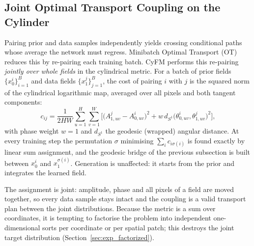 \subsection{Joint Optimal Transport Coupling on the Cylinder}
\label{sec:ot_coupling}
Pairing prior and data samples independently yields crossing conditional paths whose average the network must regress. Minibatch Optimal Transport (OT) \citep{pooladian2023multisample, tong2023improving} reduces this by re-pairing each training batch. CyFM performs this re-pairing \emph{jointly over whole fields} in the cylindrical metric. For a batch of prior fields $\{x_0^i\}_{i=1}^{B}$ and data fields $\{x_1^j\}_{j=1}^{B}$, the cost of pairing $i$ with $j$ is the squared norm of the cylindrical logarithmic map, averaged over all pixels and both tangent components:
\begin{equation}
    \label{eq:ot_cost}
    c_{ij} = \frac{1}{2HW} \sum_{u=1}^{H} \sum_{v=1}^{W} \Big[ \big(A^{j}_{1,uv} - A^{i}_{0,uv}\big)^2 + w \, d_{S^1}\big(\theta^{i}_{0,uv}, \theta^{j}_{1,uv}\big)^2 \Big],
\end{equation}
with phase weight $w = 1$ and $d_{S^1}$ the geodesic (wrapped) angular distance. At every training step the permutation $\sigma$ minimising $\sum_i c_{i\sigma(i)}$ is found exactly by linear sum assignment, and the geodesic bridge of the previous subsection is built between $x_0^i$ and $x_1^{\sigma(i)}$. Generation is unaffected: it starts from the prior and integrates the learned field.

The assignment is joint: amplitude, phase and all pixels of a field are moved together, so every data sample stays intact and the coupling is a valid transport plan between the joint distributions. Because the metric is a sum over coordinates, it is tempting to factorise the problem into independent one-dimensional sorts per coordinate or per spatial patch; this destroys the joint target distribution (Section~\ref{sec:exp_factorized}).

